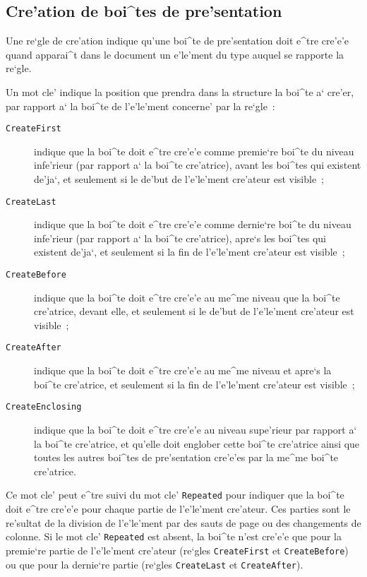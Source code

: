 {\subsection{Cre'ation de boi^tes de pre'sentation}
\label{creation}

Une re`gle de cre'ation indique qu'une boi^te de pre'sentation doit e^tre cre'e'e
quand apparai^t dans le document un e'le'ment du type auquel se rapporte
la re`gle.

Un mot cle' indique la position que prendra dans la
structure la boi^te a` cre'er, par rapport a` la boi^te de l'e'le'ment concerne'
par la re`gle~:

\begin{description}
\item[ {\tt CreateFirst} ]indique que la boi^te doit e^tre cre'e'e comme premie`re
boi^te du niveau infe'rieur (par rapport a` la boi^te cre'atrice), avant les
boi^tes qui existent de'ja`, et seulement si le de'but de l'e'le'ment cre'ateur
est visible~;

\item[ {\tt CreateLast} ]indique que la boi^te doit e^tre cre'e'e comme dernie`re
boi^te du niveau infe'rieur (par rapport a` la boi^te cre'atrice), apre`s les
boi^tes qui existent de'ja`, et seulement si la fin de l'e'le'ment cre'ateur
est visible~;

\item[ {\tt CreateBefore} ]indique que la boi^te doit e^tre cre'e'e au me^me
niveau que la boi^te cre'atrice, devant elle, et seulement si le de'but de
l'e'le'ment cre'ateur est visible~;

\item[ {\tt CreateAfter} ]indique que la boi^te doit e^tre cre'e'e au me^me
niveau et apre`s la boi^te cre'atrice, et seulement si la fin de l'e'le'ment
cre'ateur est visible~;

\item[ {\tt CreateEnclosing} ]indique que la boi^te doit e^tre cre'e'e au
niveau supe'rieur par rapport a` la boi^te cre'atrice, et qu'elle doit
englober cette boi^te cre'atrice ainsi que toutes les autres boi^tes de
pre'sentation cre'e'es par la me^me boi^te cre'atrice.

\end{description}

Ce mot cle' peut e^tre suivi du mot cle' {\tt Repeated} pour indiquer que
la boi^te doit e^tre cre'e'e pour chaque partie de l'e'le'ment cre'ateur.
Ces parties sont le re'sultat de la division de l'e'le'ment par des sauts
de page ou des changements de colonne. Si le mot cle' {\tt Repeated} est
absent, la boi^te n'est cre'e'e que pour la premie`re partie de l'e'le'ment
cre'ateur (re`gles {\tt CreateFirst} et {\tt CreateBefore}) ou que pour
la dernie`re partie (re`gles {\tt CreateLast} et {\tt CreateAfter}).

}
